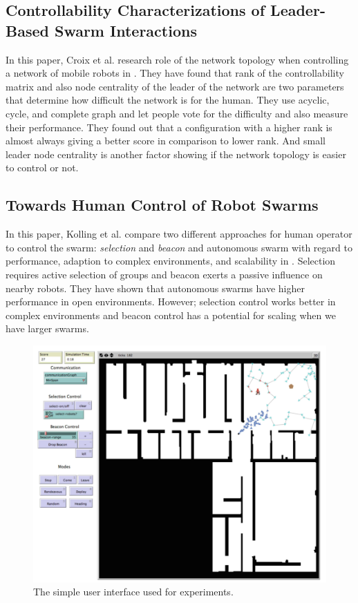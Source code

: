 \documentclass[letterpaper, 10 pt, conference]{ieeeconf}
\begin{document}
\subsection{Controllability Characterizations of Leader-Based Swarm Interactions}

In this paper, Croix et al. research role of the network topology when controlling a network of mobile robots in \cite{Croix2012}. They have found that rank of the controllability matrix and also node centrality of the leader of the network are two parameters that determine how difficult the network is for the human. They use acyclic, cycle, and complete graph and let people vote for the difficulty and also measure their performance. They found out that a configuration with a higher rank is almost always giving a better score in comparison to lower rank. And small leader node centrality is another factor showing if the network topology is easier to control or not.

\subsection{Towards Human Control of Robot Swarms}

In this paper, Kolling et al. compare two different approaches for human operator to control the swarm: \emph{selection} and \emph{beacon} and autonomous swarm with regard to performance, adaption to complex environments, and scalability in \cite{Lewis2012}. Selection requires active selection of groups and beacon exerts a passive influence on nearby robots. They have shown that autonomous swarms have higher performance in open environments. However; selection control works better in complex environments and beacon control has a potential for scaling when we have larger swarms. 
\begin{figure}[h]
\begin{center}
\includegraphics[width=\columnwidth]{Kolling.png}
\caption{The simple user interface used for experiments\cite{Lewis2012}.
\label{fig:kolling}}
\end{center}
\end{figure}
 


\end{document}
